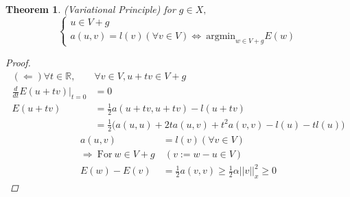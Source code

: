 \documentclass[a4paper,12pt]{article}
\newtheorem{theorem}{Theorem}
\newcommand{\R}{\mathbb{R}}
\begin{document}
\begin{theorem}(Variational Principle) for $g \in X,$
\begin{equation*}
\begin{cases}
u \in V+g\\
a(u,v) = l(v) (\forall v \in V) \Leftrightarrow\ \text{argmin}_{w \in V+g} E(w)
\end{cases}
\end{equation*}
\begin{proof}
	\begin{equation*}
	\begin{aligned}
	(\Leftarrow) \forall t \in \R,& \forall v \in V, u+tv \in V+g\\
	\frac{d}{dt} E(u+tv)|_{t=0} &= 0\\
	E(u+tv) &= \frac{1}{2} a(u+tv, u+tv) -l(u+tv)\\
	&= \frac{1}{2}\bigg(a(u,u)+2ta(u,v)+t^2a(v,v)-l(u)-tl(u)\bigg)
	\end{aligned}
	\end{equation*}
	\begin{equation*}
	\begin{aligned}
	a(u,v) &= l(v) (\forall v \in V)\\
	\Rightarrow\ \text{For}\ w \in V+g&\ (v:=w-u\in V)\\
	E(w) - E(v) &= \frac{1}{2} a(v,v) \geq \frac{1}{2} \alpha ||v||_x^2 \geq 0  
	\end{aligned}
	\end{equation*}
\end{proof}
\end{theorem}
\end{document}
